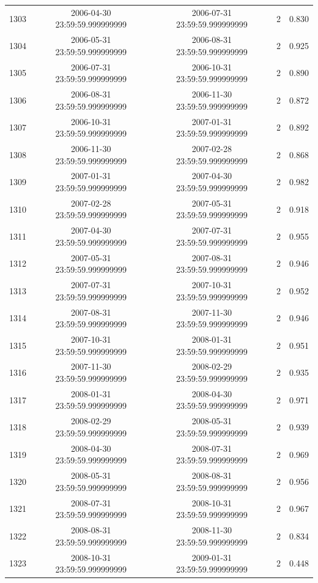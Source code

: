 \begin{table}
\begin{tabular}{lcccc}
1303 & 2006-04-30 23:59:59.999999999 & 2006-07-31 23:59:59.999999999 & 2 & 0.830 \\
1304 & 2006-05-31 23:59:59.999999999 & 2006-08-31 23:59:59.999999999 & 2 & 0.925 \\
1305 & 2006-07-31 23:59:59.999999999 & 2006-10-31 23:59:59.999999999 & 2 & 0.890 \\
1306 & 2006-08-31 23:59:59.999999999 & 2006-11-30 23:59:59.999999999 & 2 & 0.872 \\
1307 & 2006-10-31 23:59:59.999999999 & 2007-01-31 23:59:59.999999999 & 2 & 0.892 \\
1308 & 2006-11-30 23:59:59.999999999 & 2007-02-28 23:59:59.999999999 & 2 & 0.868 \\
1309 & 2007-01-31 23:59:59.999999999 & 2007-04-30 23:59:59.999999999 & 2 & 0.982 \\
1310 & 2007-02-28 23:59:59.999999999 & 2007-05-31 23:59:59.999999999 & 2 & 0.918 \\
1311 & 2007-04-30 23:59:59.999999999 & 2007-07-31 23:59:59.999999999 & 2 & 0.955 \\
1312 & 2007-05-31 23:59:59.999999999 & 2007-08-31 23:59:59.999999999 & 2 & 0.946 \\
1313 & 2007-07-31 23:59:59.999999999 & 2007-10-31 23:59:59.999999999 & 2 & 0.952 \\
1314 & 2007-08-31 23:59:59.999999999 & 2007-11-30 23:59:59.999999999 & 2 & 0.946 \\
1315 & 2007-10-31 23:59:59.999999999 & 2008-01-31 23:59:59.999999999 & 2 & 0.951 \\
1316 & 2007-11-30 23:59:59.999999999 & 2008-02-29 23:59:59.999999999 & 2 & 0.935 \\
1317 & 2008-01-31 23:59:59.999999999 & 2008-04-30 23:59:59.999999999 & 2 & 0.971 \\
1318 & 2008-02-29 23:59:59.999999999 & 2008-05-31 23:59:59.999999999 & 2 & 0.939 \\
1319 & 2008-04-30 23:59:59.999999999 & 2008-07-31 23:59:59.999999999 & 2 & 0.969 \\
1320 & 2008-05-31 23:59:59.999999999 & 2008-08-31 23:59:59.999999999 & 2 & 0.956 \\
1321 & 2008-07-31 23:59:59.999999999 & 2008-10-31 23:59:59.999999999 & 2 & 0.967 \\
1322 & 2008-08-31 23:59:59.999999999 & 2008-11-30 23:59:59.999999999 & 2 & 0.834 \\
1323 & 2008-10-31 23:59:59.999999999 & 2009-01-31 23:59:59.999999999 & 2 & 0.448 \\

\end{tabular}
\end{table}
